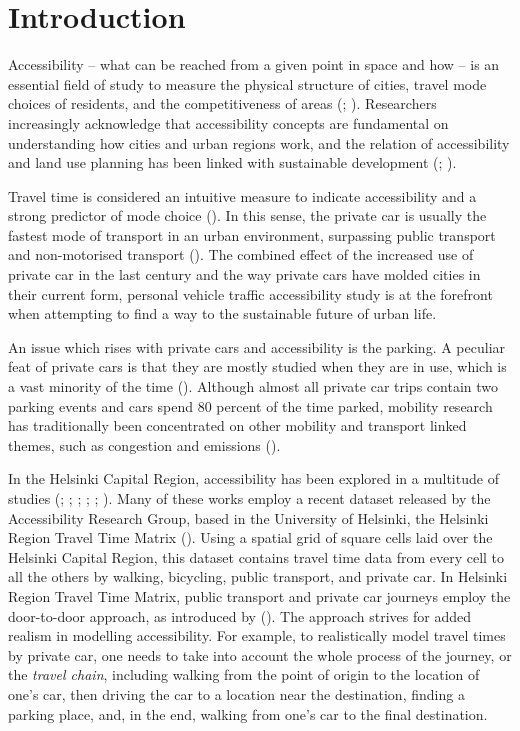 \newpage
\section{Introduction}
\justify

Accessibility -- what can be reached from a given point in space and how -- is an essential field of study to measure the physical structure of cities, travel mode choices of residents, and the competitiveness of areas (\cite{Bertolini2005}; \cite{Toivonen2014a}). Researchers increasingly acknowledge that accessibility concepts are fundamental on understanding how cities and urban regions work, and the relation of accessibility and land use planning has been linked with sustainable development (\cite{TeBrommelstroet2014}; \cite{Wegener1999}).

Travel time is considered an intuitive measure to indicate accessibility and a strong predictor of mode choice (\cite{Frank2008}). In this sense, the private car is usually the fastest mode of transport in an urban environment, surpassing public transport and non-motorised transport (\cite{Salonen2014}). The combined effect of the increased use of private car in the last century and the way private cars have molded cities in their current form, personal vehicle traffic accessibility study is at the forefront when attempting to find a way to the sustainable future of urban life. 

An issue which rises with private cars and accessibility is the parking. A peculiar feat of private cars is that they are mostly studied when they are in use, which is a vast minority of the time (\cite{Diallo2015}). Although almost all private car trips contain two parking events and cars spend 80 percent of the time parked, mobility research has traditionally been concentrated on other mobility and transport linked themes, such as congestion and emissions (\cite{Bates2012}). 

In the Helsinki Capital Region, accessibility has been explored in a multitude of studies (\cite{Jarvi2014}; \cite{Toivonen2014a}; \cite{Laatikainen2015}; \cite{Salonen2016}; \cite{Tenkanen2017}; \cite{Tenkanen2018}). Many of these works employ a recent dataset released by the Accessibility Research Group, based in the University of Helsinki, the Helsinki Region Travel Time Matrix (\cite{Tenkanen2018}). Using a spatial grid of square cells laid over the Helsinki Capital Region, this dataset contains travel time data from every cell to all the others by walking, bicycling, public transport, and private car. In Helsinki Region Travel Time Matrix, public transport and private car journeys employ the door-to-door approach, as introduced by \citeauthor{Salonen2013} (\citeyear{Salonen2013}). The approach strives for added realism in modelling accessibility. For example, to realistically model travel times by private car, one needs to take into account the whole process of the journey, or the \textit{travel chain}, including walking from the point of origin to the location of one's car, then driving the car to a location near the destination, finding a parking place, and, in the end, walking from one's car to the final destination.

